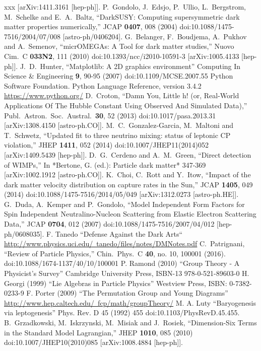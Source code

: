 \begin{thebibliography}{xxx}
  [arXiv:1411.3161 [hep-ph]].
    P.~Gondolo, J.~Edsjo, P.~Ullio, L.~Bergstrom, M.~Schelke and E.~A.~Baltz,
  ``DarkSUSY: Computing supersymmetric dark matter properties numerically,''
  JCAP {\bf 0407}, 008 (2004)
  doi:10.1088/1475-7516/2004/07/008
  [astro-ph/0406204].
    G.~Belanger, F.~Boudjema, A.~Pukhov and A.~Semenov,
  ``micrOMEGAs: A Tool for dark matter studies,''
  Nuovo Cim.\ C {\bf 033N2}, 111 (2010)
  doi:10.1393/ncc/i2010-10591-3
  [arXiv:1005.4133 [hep-ph]].
  J.~D.~Hunter, 
  ``Matplotlib: A 2D graphics environment''
  Computing In Science \& Engineering {\bf{9}}, 90-95 (2007)
  doi:10.1109/MCSE.2007.55
  Python Software Foundation. Python Language Reference, version 3.4.2 \href{https://www.python.org/}{https://www.python.org/}
    D.~Croton,
  ``Damn You, Little h! (or, Real-World Applications Of The Hubble Constant Using Observed And Simulated Data),''
  Publ.\ Astron.\ Soc.\ Austral.\  {\bf 30}, 52 (2013)
  doi:10.1017/pasa.2013.31
  [arXiv:1308.4150 [astro-ph.CO]].
    M.~C.~Gonzalez-Garcia, M.~Maltoni and T.~Schwetz,
  ``Updated fit to three neutrino mixing: status of leptonic CP violation,''
  JHEP {\bf 1411}, 052 (2014)
  doi:10.1007/JHEP11(2014)052
    [arXiv:1409.5439 [hep-ph]].
    D.~G.~Cerdeno and A.~M.~Green,
  ``Direct detection of WIMPs,''
  In *Bertone, G. (ed.): Particle dark matter* 347-369
  [arXiv:1002.1912 [astro-ph.CO]].
    K.~Choi, C.~Rott and Y.~Itow,
  ``Impact of the dark matter velocity distribution on capture rates in the Sun,''
  JCAP {\bf 1405}, 049 (2014)
  doi:10.1088/1475-7516/2014/05/049
  [arXiv:1312.0273 [astro-ph.HE]].
    G.~Duda, A.~Kemper and P.~Gondolo,
  ``Model Independent Form Factors for Spin Independent Neutralino-Nucleon Scattering from Elastic Electron Scattering Data,''
  JCAP {\bf 0704}, 012 (2007)
  doi:10.1088/1475-7516/2007/04/012
  [hep-ph/0608035].
  F. Tanedo ``Defense Against the Dark Arts``\\ \href{http://www.physics.uci.edu/~tanedo/files/notes/DMNotes.pdf}{http://www.physics.uci.edu/~tanedo/files/notes/DMNotes.pdf}
   C.~Patrignani,
  ``Review of Particle Physics,''
  Chin.\ Phys.\ C {\bf 40}, no. 10, 100001 (2016).
  doi:10.1088/1674-1137/40/10/100001 
  P. Ramond (2010) ``Group Theory - A Physicist's Survey'' Cambridge University Press, ISBN-13 978-0-521-89603-0 
 H. Georgi (1999) ``Lie Algebras in Particle Physics'' Westview Press, ISBN: 0-7382-0233-9
 F. Porter (2009) ``The Permutation Group and Young Diagrams'' \href{http://www.hep.caltech.edu/~fcp/math/groupTheory/}{http://www.hep.caltech.edu/~fcp/math/groupTheory/}
 M. A. Luty ``Baryogenesis via leptogenesis'' Phys. Rev. D 45 (1992) 455 doi:10.1103/PhysRevD.45.455.
  B.~Grzadkowski, M.~Iskrzynski, M.~Misiak and J.~Rosiek,
  ``Dimension-Six Terms in the Standard Model Lagrangian,''
  JHEP {\bf 1010}, 085 (2010)
  doi:10.1007/JHEP10(2010)085
  [arXiv:1008.4884 [hep-ph]].
\end{thebibliography}